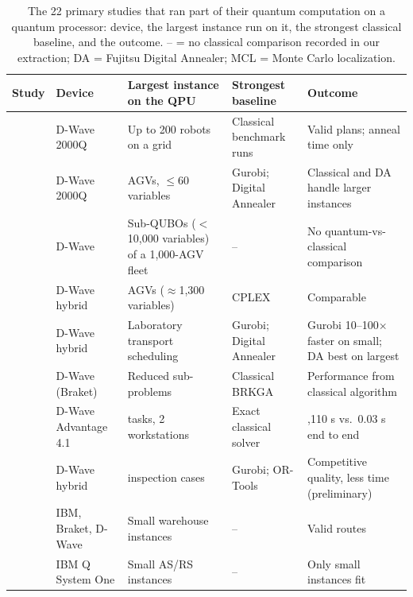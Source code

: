 \documentclass[acmsmall,screen,review]{acmart}
\begin{document}
\begin{table}[tbp]
\caption{The 22 primary studies that ran part of their quantum computation on a quantum processor: device, the largest instance run on it, the strongest classical baseline, and the outcome. -- = no classical comparison recorded in our extraction; DA = Fujitsu Digital Annealer; MCL = Monte Carlo localization.}
\label{tab:qpu}
\scriptsize
\begin{tabular}{@{}>{\raggedright\arraybackslash}p{0.170\dimexpr\linewidth-10\tabcolsep\relax}>{\raggedright\arraybackslash}p{0.150\dimexpr\linewidth-10\tabcolsep\relax}>{\raggedright\arraybackslash}p{0.230\dimexpr\linewidth-10\tabcolsep\relax}>{\raggedright\arraybackslash}p{0.190\dimexpr\linewidth-10\tabcolsep\relax}>{\raggedright\arraybackslash}p{0.260\dimexpr\linewidth-10\tabcolsep\relax}@{}}
\toprule
\textbf{Study} & \textbf{Device} & \textbf{Largest instance on the QPU} & \textbf{Strongest baseline} & \textbf{Outcome} \\ \midrule
\citet{Clark2019} & D-Wave 2000Q & Up to 200 robots on a grid & Classical benchmark runs & Valid plans; anneal time only \\
\citet{Ohzeki2019} & D-Wave 2000Q & 10 AGVs, $\le$60 variables & Gurobi; Digital Annealer & Classical and DA handle larger instances \\
\citet{Quang2025} & D-Wave & Sub-QUBOs ($<$10,000 variables) of a 1,000-AGV fleet & -- & No quantum-vs-classical comparison \\
\citet{Smierzchalski2024} & D-Wave hybrid & 21 AGVs ($\approx$1,300 variables) & CPLEX & Comparable \\
\citet{Leib2023} & D-Wave hybrid & Laboratory transport scheduling & Gurobi; Digital Annealer & Gurobi 10--100$\times$ faster on small; DA best on largest \\
\citet{Schuetz2022} & D-Wave (Braket) & Reduced sub-problems & Classical BRKGA & Performance from classical algorithm \\
\citet{Willmann2025} & D-Wave Advantage 4.1 & 4 tasks, 2 workstations & Exact classical solver & 10,110 s vs.\ 0.03 s end to end \\
\citet{Osaba2025} & D-Wave hybrid & 5 inspection cases & Gurobi; OR-Tools & Competitive quality, less time (preliminary) \\
\citet{AtchadeAdelomou2021} & IBM, Braket, D-Wave & Small warehouse instances & -- & Valid routes \\
\citet{Windmann2023} & IBM Q System One & Small AS/RS instances & -- & Only small instances fit \\

\end{tabular}
\end{table}
\end{document}
